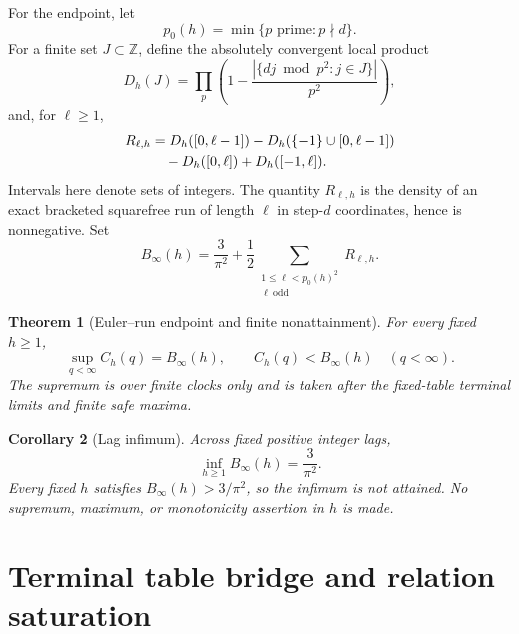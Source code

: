 \documentclass[11pt]{article}
\newtheorem{theorem}{Theorem}[section]
\newtheorem{corollary}[theorem]{Corollary}
\theoremstyle{definition}
\theoremstyle{remark}
\newcommand{\Z}{\mathbb Z}
\begin{document}
For the endpoint, let
\begin{equation}
 p_0(h)=\min\{p\text{ prime}:p\nmid d\}.
 \label{eq:p0}
\end{equation}
For a finite set \(J\subset\Z\), define the absolutely convergent local
product
\begin{equation}
 D_h(J)=\prod_p\left(
 1-\frac{|\{dj\bmod p^2:j\in J\}|}{p^2}\right),
 \label{eq:Dh}
\end{equation}
and, for \(\ell\geq1\),
\begin{align}
 R_{\ell,h}
 &=D_h([0,\ell-1])-D_h(\{-1\}\cup[0,\ell-1])
 \notag\\
 &\quad-D_h([0,\ell])+D_h([-1,\ell]).
 \label{eq:Rlh}
\end{align}
Intervals here denote sets of integers.  The quantity \(R_{\ell,h}\) is
the density of an exact bracketed squarefree run of length \(\ell\) in
step-\(d\) coordinates, hence is nonnegative.  Set
\begin{equation}
 B_\infty(h)=\frac3{\pi^2}
 +\frac12\sum_{\substack{1\leq\ell<p_0(h)^2\\\ell\ \mathrm{odd}}}
 R_{\ell,h}.
 \label{eq:Binfinity}
\end{equation}

\begin{theorem}[Euler--run endpoint and finite nonattainment]
\label{thm:endpoint}
For every fixed \(h\geq1\),
\begin{equation}
 \boxed{\sup_{q<\infty}C_h(q)=B_\infty(h),\qquad
 C_h(q)<B_\infty(h)\quad(q<\infty).}
 \label{eq:all-clock-endpoint}
\end{equation}
The supremum is over finite clocks only and is taken after the fixed-table
terminal limits and finite safe maxima.
\end{theorem}

\begin{corollary}[Lag infimum]
\label{cor:lag-infimum}
Across fixed positive integer lags,
\begin{equation}
 \boxed{\inf_{h\geq1}B_\infty(h)=\frac3{\pi^2}.}
 \label{eq:lag-infimum}
\end{equation}
Every fixed \(h\) satisfies \(B_\infty(h)>3/\pi^2\), so the infimum is
not attained.  No supremum, maximum, or monotonicity assertion in \(h\)
is made.
\end{corollary}

\section{Terminal table bridge and relation saturation}
\end{document}

